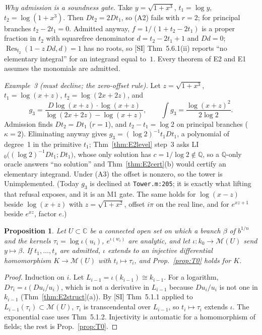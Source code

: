 \documentclass[11pt]{article}
\newtheorem{proposition}[theorem]{Proposition}
\theoremstyle{definition}
\theoremstyle{remark}
\newcommand{\Q}{\mathbb{Q}}
\newcommand{\C}{\mathbb{C}}
\newcommand{\code}[1]{\texttt{#1}}
\begin{document}
\emph{Why admission is a soundness gate.} Take $y=\sqrt{1+x^3}$, $t_1=\log y$,
$t_2=\log(1+x^3)$. Then $Dt_2=2Dt_1$, so (A2) fails with $r=2$; for principal branches
$t_2-2t_1=0$. Admitted anyway, $f=1/(1+t_2-2t_1)$ is a proper fraction in $t_2$ with
squarefree denominator $d=t_2-2t_1+1$ and $Dd=0$; $\operatorname{Res}_{t_2}(1-z\,Dd,d)=1$
has no roots, so [SI] Thm~5.6.1(ii) reports ``no elementary integral'' for an integrand
equal to~$1$. Every theorem of E2 and E1 assumes the monomials are admitted.

\emph{Example~3 (must decline; the zero-offset rule).} Let $z=\sqrt{1+x^3}$, $t_1=\log(x+z)$,
$t_2=\log(2x+2z)$, and
\[ g_3=\frac{D\log(x+z)\cdot\log(x+z)}{\log(2x+2z)-\log(x+z)}, \qquad
   \int g_3=\frac{\log(x+z)^2}{2\log2}. \]
Admission finds $Dt_2=Dt_1$ ($r=1$), and $t_2-t_1=\log2$ on principal branches ($\kappa=2$).
Eliminating anyway gives $g_3=(\log2)^{-1}t_1Dt_1$, a polynomial of degree~1 in the
primitive $t_1$; Thm~\ref{thm:E2level} step~3 asks LI$_0\bigl((\log 2)^{-1}Dt_1;Dt_1\bigr)$,
whose only solution has $c=1/\log2\notin\Q$, so a $\Q$-only oracle answers ``no solution'' and
Thm~\ref{thm:E2cert}(b) would certify an elementary integrand. Under (A3) the offset is
nonzero, so the tower is Unimplemented. (Today $g_3$ is declined at \code{Tower.m:205}; it is
exactly what lifting that refusal exposes, and it is an M1 gate. The same holds for $\log(x-z)$
beside $\log(x+z)$ with $z=\sqrt{1+x^2}$, offset $i\pi$ on the real line, and for $e^{xz+1}$
beside $e^{xz}$, factor $e$.)

\begin{proposition}\label{prop:E2analytic}
Let $U\subset\C$ be a connected open set on which a branch $\beta$ of $b^{1/n}$ and the
kernels $\tau_i=\log\iota(u_i)$, $e^{\iota(w_i)}$ are analytic, and let $\iota:k_0\to\mathcal
M(U)$ send $y\mapsto\beta$. If $t_1,\dots,t_s$ are admitted, $\iota$ extends to an
injective differential homomorphism $K\to\mathcal M(U)$ with $t_i\mapsto\tau_i$, and
Prop.~\ref{prop:T0} holds for $K$.
\end{proposition}
\begin{proof}
Induction on $i$. Let $L_{i-1}=\iota(k_{i-1})\cong k_{i-1}$. For a logarithm,
$D\tau_i=\iota(Du_i/u_i)$, which is not a derivative in $L_{i-1}$ because $Du_i/u_i$ is
not one in $k_{i-1}$ (Thm~\ref{thm:E2struct}(a)). By [SI] Thm~5.1.1 applied to
$L_{i-1}(\tau_i)\subset\mathcal M(U)$, $\tau_i$ is transcendental over $L_{i-1}$, so
$t_i\mapsto\tau_i$ extends $\iota$. The exponential case uses Thm~5.1.2. Injectivity is
automatic for a homomorphism of fields; the rest is Prop.~\ref{prop:T0}.
\end{proof}
\end{document}
